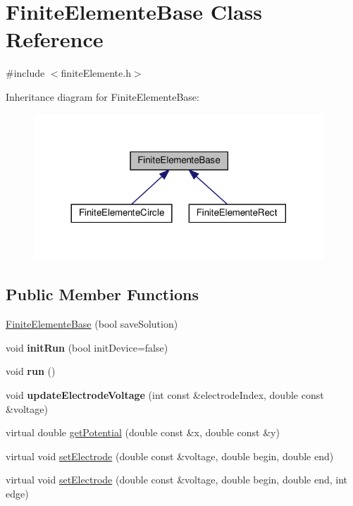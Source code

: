 \hypertarget{classFiniteElementeBase}{}\section{Finite\+Elemente\+Base Class Reference}
\label{classFiniteElementeBase}


{\ttfamily \#include $<$finite\+Elemente.\+h$>$}



Inheritance diagram for Finite\+Elemente\+Base\+:\nopagebreak
\begin{figure}[H]
\begin{center}
\leavevmode
\includegraphics[width=308pt]{classFiniteElementeBase__inherit__graph}
\end{center}
\end{figure}
\subsection*{Public Member Functions}
\begin{DoxyCompactItemize}
\item 
\hyperlink{classFiniteElementeBase_a64ce4d3439a1ca2dfad3fdbe65f1b128}{Finite\+Elemente\+Base} (bool save\+Solution)
\item 
\mbox{\label{classFiniteElementeBase_a75213fac01c8b3cd838d6cdcfcd45eb6}} 
void {\bfseries init\+Run} (bool init\+Device=false)
\item 
\mbox{\label{classFiniteElementeBase_a0ae38114396c8676e1c2504f3e21f1c0}} 
void {\bfseries run} ()
\item 
\mbox{\label{classFiniteElementeBase_a76778a3d7a97a6cb3121ac99ee232af2}} 
void {\bfseries update\+Electrode\+Voltage} (int const \&electrode\+Index, double const \&voltage)
\item 
virtual double \hyperlink{classFiniteElementeBase_aee384092436f2288ba1ceaf0f279afed}{get\+Potential} (double const \&x, double const \&y)
\item 
virtual void \hyperlink{classFiniteElementeBase_aff6763fa857bc57a629ef1c973fa5a49}{set\+Electrode} (double const \&voltage, double begin, double end)
\item 
virtual void \hyperlink{classFiniteElementeBase_abd7e36541ce728ab710166ab50fad93f}{set\+Electrode} (double const \&voltage, double begin, double end, int edge)
\end{DoxyCompactItemize}
